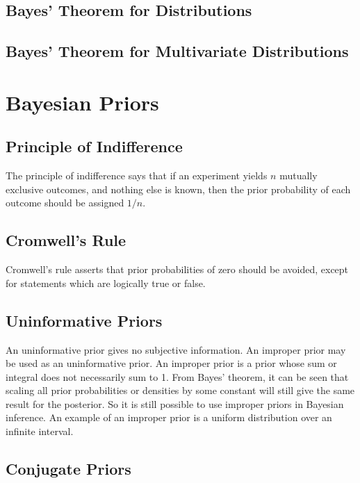 \documentclass[11pt]{report} %
\begin{document}
\subsection{Bayes' Theorem for Distributions}

\subsection{Bayes' Theorem for Multivariate Distributions}

\section{Bayesian Priors}

\subsection{Principle of Indifference}

The principle of indifference says that if an experiment yields $n$ mutually exclusive outcomes, and nothing else is known, then the prior probability of each outcome should be assigned $1/n$.

\subsection{Cromwell's Rule}

Cromwell's rule asserts that prior probabilities of zero should be avoided, except for statements which are logically true or false.

\subsection{Uninformative Priors}

An uninformative prior gives no subjective information. An improper prior may be used as an uninformative prior. An improper prior is a prior whose sum or integral does not necessarily sum to 1. From Bayes' theorem, it can be seen that scaling all prior probabilities or densities by some constant will still give the same result for the posterior. So it is still possible to use improper priors in Bayesian inference. An example of an improper prior is a uniform distribution over an infinite interval.

\subsection{Conjugate Priors}
\end{document}
